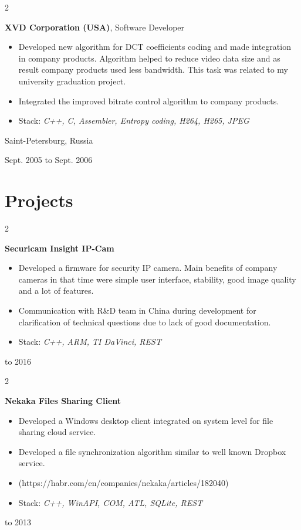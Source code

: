 \documentclass[10pt, letterpaper]{article}
\newenvironment{highlights}{
    \begin{itemize}[
        topsep=0.10 cm,
        parsep=0.10 cm,
        partopsep=0pt,
        itemsep=0pt,
        leftmargin=0.4 cm + 10pt
    ]
}{
    \end{itemize}
} %
\newenvironment{twocolentry}[2][]{
    \onecolentry
    \def\secondColumn{#2}
    \setcolumnwidth{\fill, 4.5 cm}
    \begin{paracol}{2}
}{
    \switchcolumn \raggedleft \secondColumn
    \end{paracol}
    \endonecolentry
} %
\begin{document}
        \begin{twocolentry}{
            Saint-Petersburg, Russia

        Sept. 2005 to Sept. 2006
        }
            \textbf{XVD Corporation (USA)}, Software Developer
            \begin{highlights}
                \item Developed new algorithm for DCT coefficients coding and made integration in company products. Algorithm helped to reduce video data size and as result company products used less bandwidth. This task was related to my university graduation project.
                \item Integrated the improved bitrate control algorithm to company products.
                \item Stack: \textit{C++, C, Assembler, Entropy coding, H264, H265, JPEG}
            \end{highlights}
        \end{twocolentry}



    
    \section{Projects}

        
        \begin{twocolentry}{
            2014 to 2016
        }
            \textbf{Securicam Insight IP-Cam}
            \begin{highlights}
                \item Developed a firmware for security IP camera. Main benefits of company cameras in that time were simple user interface, stability, good image quality and a lot of features.
                \item Communication with R\&D team in China during development for clarification of technical questions due to lack of good documentation.
                \item Stack: \textit{C++, ARM, TI DaVinci, REST}
            \end{highlights}
        \end{twocolentry}


        \vspace{0.2 cm}

        \begin{twocolentry}{
            2012 to 2013
        }
            \textbf{Nekaka Files Sharing Client}
            \begin{highlights}
                \item Developed a Windows desktop client integrated on system level for file sharing cloud service.
                \item Developed a file synchronization algorithm similar to well known Dropbox service.
                \item (https://habr.com/en/companies/nekaka/articles/182040)
                \item Stack: \textit{C++, WinAPI, COM, ATL, SQLite, REST}
            \end{highlights}
        \end{twocolentry}
\end{document}
